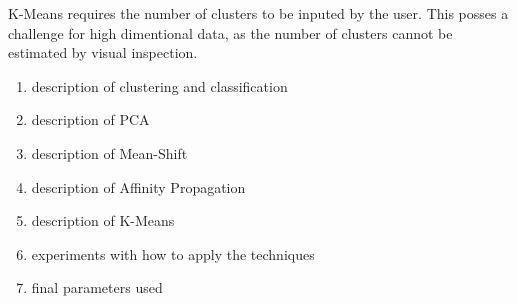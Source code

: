 K-Means requires the number of clusters to be inputed by the user. 
This posses a challenge for high dimentional data, as the number of clusters cannot be estimated by visual inspection. 





\begin{enumerate}
\item description of clustering and classification 
\item description of PCA
\item description of Mean-Shift
\item description of Affinity Propagation
\item description of K-Means
\item experiments with how to apply the techniques
\item final parameters used
\end{enumerate}
